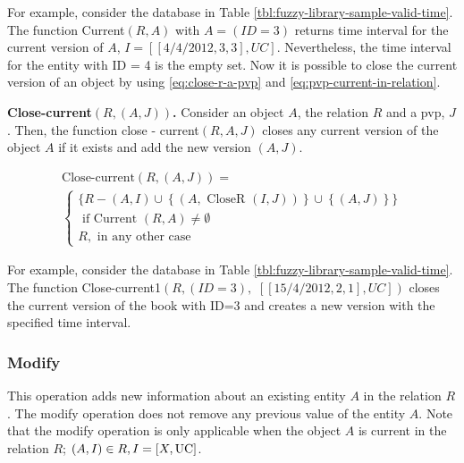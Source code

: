 For example, consider the database in Table \ref{tbl:fuzzy-library-sample-valid-time}. The function Current$\left(R, A \right)$ with $A =\left(ID=3\right)$ returns time interval for the current version of $A$, $I = \left[ \left[4/4/2012, 3, 3 \right], UC \right]$. Nevertheless, the time interval for the entity with ID = 4 is the empty set.
Now it is possible to close the current version of an object by using \eqref{eq:close-r-a-pvp} and \eqref{eq:pvp-current-in-relation}.

\begin{definition}
\label{def:pvp-close-current-version}
\textbf{Close-current$\left(R, \left(A, J \right) \right)$.}
Consider an object $A$, the relation $R$ and a pvp, $J$. Then, the function close - current$\left(R, A, J \right)$ closes any current version of the object $A$ if it exists and add the new version $\left(A, J \right)$.

\begin{eqnarray}
\label{eq:pvp-close-current}
\text{Close-current} \left(R, \left(A, J \right) \right) =\\
\begin{cases}
\nonumber
\big \lbrace R - \left(A, I \right) \cup \left \lbrace \left(A, \mbox{ CloseR } \left(I, J\right) \right) \right \rbrace \cup \left \lbrace \left(A, J\right)\right \rbrace  \big \rbrace \\
\nonumber
\mbox{ if Current } \left(R, A \right) \neq \emptyset \\ %
\nonumber R , \text{ in any other case}
\end{cases}
\end{eqnarray}
\end{definition}

For example, consider the database in Table  \ref{tbl:fuzzy-library-sample-valid-time}. The function Close-current1$\left(R, \left(ID=3\right) \right.,$ $\left. \left[ \left[15/4/2012,2,1\right], UC\right]\right)$ closes the current version of the book with ID=3 and creates a new version with the specified time interval.

\subsubsection{\label{subsubsec:modify-fuzzy-temporal}Modify}
This operation adds new information about an existing entity $A$ in the relation $R$. The modify operation does not remove any previous value of the entity $A$.
Note that the modify operation is only applicable when the object $A$ is current in the relation $R$; $ \left(A, I \right) \in R, I = \left[X, \operatorname{UC} \right]$.

